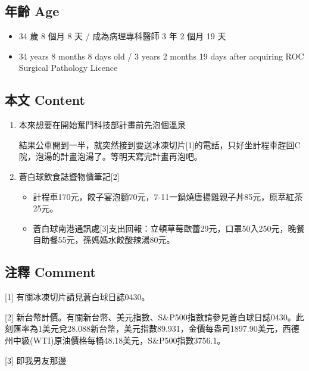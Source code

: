 \documentclass[a5paper, 11pt
]{book}
\providecommand{\tightlist}{%
  \setlength{\itemsep}{0pt}\setlength{\parskip}{0pt}}
\begin{document}
\hypertarget{ux5e74ux9f61-age-30}{%
\subsection{年齡 Age}\label{ux5e74ux9f61-age-30}}

\begin{itemize}
\tightlist
\item
  34 歲 8 個月 8 天 / 成為病理專科醫師 3 年 2 個月 19 天
\item
  34 years 8 months 8 days old / 3 years 2 months 19 days after
  acquiring ROC Surgical Pathology Licence
\end{itemize}

\hypertarget{ux672cux6587-content-30}{%
\subsection{本文 Content}\label{ux672cux6587-content-30}}

\begin{enumerate}
\def\labelenumi{\arabic{enumi}.}
\item
  本來想要在開始奮鬥科技部計畫前先泡個溫泉

  結果公車開到一半，就突然接到要送冰凍切片{[}1{]}的電話，只好坐計程車趕回C院，泡湯的計畫泡湯了。等明天寫完計畫再泡吧。
\item
  蒼白球飲食誌暨物價筆記{[}2{]}

  \begin{itemize}
  \tightlist
  \item
    計程車170元，餃子宴泡麵70元，7-11一鍋燒唐揚雞親子丼85元，原萃紅茶25元。
  \item
    蒼白球南港通訊處{[}3{]}支出回報：立頓草莓歐蕾29元，口罩50入250元，晚餐自助餐55元，孫媽媽水餃酸辣湯80元。
  \end{itemize}
\end{enumerate}

\hypertarget{ux6ce8ux91cb-comment-30}{%
\subsection{注釋 Comment}\label{ux6ce8ux91cb-comment-30}}

{[}1{]} 有關冰凍切片請見蒼白球日誌0430。

{[}2{]}
新台幣計價。有關新台幣、美元指數、S\&P500指數請參見蒼白球日誌0430。此刻匯率為1美元兌28.088新台幣，美元指數89.931，金價每盎司1897.90美元，西德州中級(WTI)原油價格每桶48.18美元，S\&P500指數3756.1。

{[}3{]} 即我男友那邊
\end{document}
